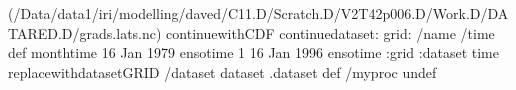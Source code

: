 \begin{ingrid}
(/Data/data1/iri/modelling/daved/C11.D/Scratch.D/V2T42p006.D/Work.D/DATARED.D/grads.lats.nc) continuewithCDF
continuedataset: 
grid:
/name /time def
monthtime
16 Jan 1979 ensotime
1
16 Jan 1996 ensotime
:grid
:dataset
time replacewithdatasetGRID
/dataset dataset .dataset def
/myproc undef
\end{ingrid}
